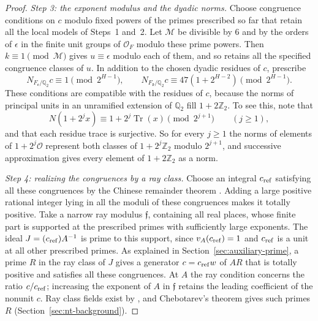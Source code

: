 \documentclass[11pt]{article}
\theoremstyle{plain}
\theoremstyle{definition}
\theoremstyle{remark}
\newcommand{\Z}{\mathbb Z}
\newcommand{\Q}{\mathbb Q}
\newcommand{\OO}{\mathcal O}
\begin{document}
\begin{proof}
\emph{Step 3: the exponent modulus and the dyadic norms.}  Choose
congruence conditions on $c$ modulo fixed powers of the primes prescribed
so far that retain all the local models of Steps~1 and~2.  Let $\mathcal
M$ be divisible by $6$ and by the orders of $\epsilon$ in the finite unit
groups of $\OO_F$ modulo these prime powers.  Then
$k\equiv1\pmod{\mathcal M}$ gives $u\equiv\epsilon$ modulo each of them,
and so retains all the specified congruence classes of $u$.  In addition
to the chosen dyadic residues of $c$, prescribe
\begin{equation}\label{eq:ray-norms}
 N_{F_{\mathfrak e}/\Q_2}c\equiv1\pmod{2^{H-1}},\qquad
 N_{F_{\mathfrak d}/\Q_2}c\equiv47(1+2^{H-2})\pmod{2^{H-1}}.
\end{equation}
These conditions are compatible with the residues of $c$, because the
norms of principal units in an unramified extension of $\Q_2$ fill
$1+2\Z_2$.  To see this, note that
\[
  N(1+2^jx)\equiv1+2^j\operatorname{Tr}(x)\pmod{2^{j+1}}\qquad(j\ge1),
\]
and that each residue trace is surjective.  So for every $j\ge1$ the norms
of elements of $1+2^j\OO$ represent both classes of $1+2^j\Z_2$ modulo
$2^{j+1}$, and successive approximation gives every element of
$1+2\Z_2$ as a norm.

\emph{Step 4: realizing the congruences by a ray class.}  Choose an
integral $c_{\rm ref}$ satisfying all these congruences by the Chinese
remainder theorem \cite[Theorem~1.14]{MilneANT}.  Adding a large positive
rational integer lying in all the moduli of these congruences makes it
totally positive.  Take a narrow ray modulus $\mathfrak f$, containing all
real places, whose finite part is supported at the prescribed primes with
sufficiently large exponents.  The ideal $J=(c_{\rm ref})A^{-1}$ is prime
to this support, since $v_A(c_{\rm ref})=1$ and $c_{\rm ref}$ is a unit
at all other prescribed primes.  As explained in
Section~\ref{sec:auxiliary-prime}, a prime $R$ in the ray class of $J$
gives a generator $c=c_{\rm ref}w$ of $AR$ that is totally positive
and satisfies all these congruences.  At $A$ the ray condition concerns
the ratio $c/c_{\rm ref}$; increasing the exponent of $A$ in $\mathfrak f$
retains the leading coefficient of the nonunit $c$.  Ray class fields
exist by \cite[Chapter~V, Theorems~3.5--3.6]{MilneCFT}, and Chebotarev's
theorem gives such primes $R$ (Section~\ref{sec:nt-background}).


\end{proof}
\end{document}
